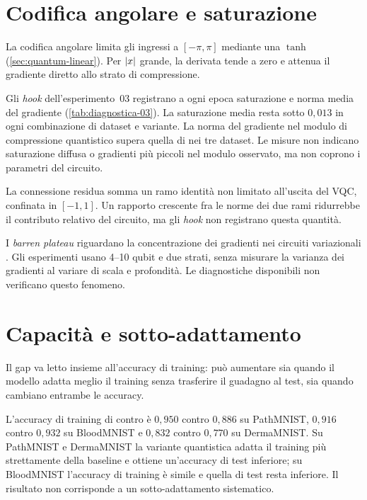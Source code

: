 \section{Codifica angolare e saturazione}
\label{sec:saturazione}

La codifica angolare limita gli ingressi a $[-\pi,\pi]$ mediante una $\tanh$
(\cref{sec:quantum-linear}). Per $\lvert x \rvert$ grande, la derivata tende a zero e
attenua il gradiente diretto allo strato di compressione.

Gli \emph{hook} dell'esperimento~03 registrano a ogni epoca saturazione e norma
media del gradiente (\cref{tab:diagnostica-03}). La saturazione media resta sotto
$0{,}013$ in ogni combinazione di dataset e variante. La norma del gradiente nel
modulo di compressione quantistico supera quella di  nei tre
dataset. Le misure non indicano saturazione diffusa o gradienti più piccoli nel
modulo osservato, ma non coprono i parametri del circuito.

La connessione residua somma un ramo identità non limitato all'uscita del VQC,
confinata in $[-1,1]$. Un rapporto crescente fra le norme dei due rami
ridurrebbe il contributo relativo del circuito, ma gli \emph{hook} non registrano
questa quantità.

I \emph{barren plateau} riguardano la concentrazione dei gradienti nei circuiti
variazionali \parencite{mcclean2018barren}. Gli esperimenti usano 4--10 qubit e
due strati, senza misurare la varianza dei gradienti al variare di scala e
profondità. Le diagnostiche disponibili non verificano questo fenomeno.

\section{Capacità e sotto-adattamento}
\label{sec:capacita}

Il gap va letto insieme all'accuracy di training: può aumentare sia quando il
modello adatta meglio il training senza trasferire il guadagno al test, sia
quando cambiano entrambe le accuracy.

L'accuracy di training di  contro
 è $0{,}950$ contro $0{,}886$ su PathMNIST, $0{,}916$ contro
$0{,}932$ su BloodMNIST e $0{,}832$ contro $0{,}770$ su DermaMNIST. Su PathMNIST e
DermaMNIST la variante quantistica adatta il training più strettamente della
baseline e ottiene un'accuracy di test inferiore; su BloodMNIST l'accuracy di
training è simile e quella di test resta inferiore. Il risultato non corrisponde
a un sotto-adattamento sistematico.


